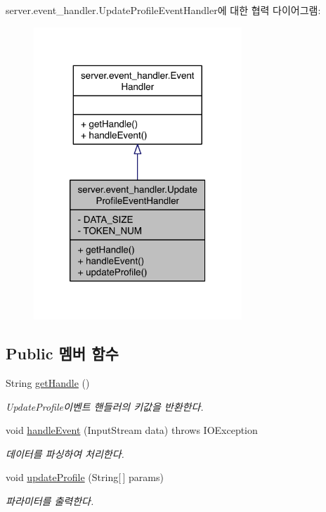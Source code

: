 server.\-event\-\_\-handler.\-Update\-Profile\-Event\-Handler에 대한 협력 다이어그램\-:\nopagebreak
\begin{figure}[H]
\begin{center}
\leavevmode
\includegraphics[width=222pt]{classserver_1_1event__handler_1_1_update_profile_event_handler__coll__graph}
\end{center}
\end{figure}
\subsection*{Public 멤버 함수}
\begin{DoxyCompactItemize}
\item 
String \hyperlink{classserver_1_1event__handler_1_1_update_profile_event_handler_a2fe659402302ba5254fbd5db5aa37f49}{get\-Handle} ()
\begin{DoxyCompactList}\small\item\em Update\-Profile이벤트 핸들러의 키값을 반환한다. \end{DoxyCompactList}\item 
void \hyperlink{classserver_1_1event__handler_1_1_update_profile_event_handler_a48a8c2c909585327d6ea0c5ecc06f6ee}{handle\-Event} (Input\-Stream data)  throws I\-O\-Exception 
\begin{DoxyCompactList}\small\item\em 데이터를 파싱하여 처리한다. \end{DoxyCompactList}\item 
void \hyperlink{classserver_1_1event__handler_1_1_update_profile_event_handler_a601bec62fe1c6e7d783de2a824a20fb7}{update\-Profile} (String\mbox{[}$\,$\mbox{]} params)
\begin{DoxyCompactList}\small\item\em 파라미터를 출력한다. \end{DoxyCompactList}\end{DoxyCompactItemize}
